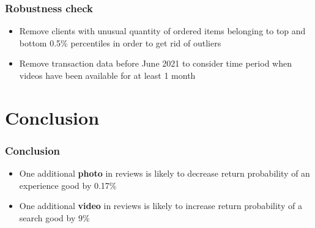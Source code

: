 \documentclass[xcolor=dvipsnames,envcountsect]{beamer}
\begin{document}
\begin{frame}
	\frametitle{Robustness check}
	\justifying

    \begin{itemize}
        \item Remove clients with unusual quantity of ordered
        items belonging to top and bottom 0.5\% percentiles in order to get rid of outliers
        \item Remove transaction data before June 2021 to consider time period when videos have been available for at least 1 month
    \end{itemize}
\end{frame}

\section{Conclusion}
\begin{frame}
	\frametitle{Conclusion}
	\justifying

    \begin{itemize}
        \item One additional \textbf{photo} in reviews is likely to decrease return probability of an experience good by 0.17\%
        \item One additional \textbf{video} in reviews is likely to increase return probability of a search good by 9\%
        
    \end{itemize}
\end{frame}
\end{document}
